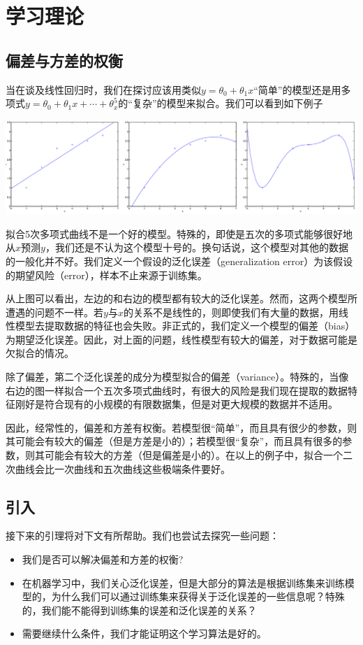 \section{学习理论}
\subsection{偏差与方差的权衡}
当在谈及线性回归时，我们在探讨应该用类似$y=\theta_0+\theta_1x$“简单”的模型还是用多项式$y=\theta_0+\theta_1x+\cdots+\theta_x^5$的“复杂”的模型来拟合。我们可以看到如下例子
\begin{center}
\includegraphics[scale=0.5]{../figures/LT1.PNG} 
\end{center}
拟合5次多项式曲线不是一个好的模型。特殊的，即使是五次的多项式能够很好地从$x$预测$y$，我们还是不认为这个模型十号的。换句话说，这个模型对其他的数据的一般化并不好。我们定义一个假设的泛化误差（generalization error）为该假设的期望风险（error），样本不止来源于训练集。

从上图可以看出，左边的和右边的模型都有较大的泛化误差。然而，这两个模型所遭遇的问题不一样。若$y$与$x$的关系不是线性的，则即使我们有大量的数据，用线性模型去提取数据的特征也会失败。非正式的，我们定义一个模型的偏差（bias）为期望泛化误差。因此，对上面的问题，线性模型有较大的偏差，对于数据可能是欠拟合的情况。

除了偏差，第二个泛化误差的成分为模型拟合的偏差（variance）。特殊的，当像右边的图一样拟合一个五次多项式曲线时，有很大的风险是我们现在提取的数据特征刚好是符合现有的小规模的有限数据集，但是对更大规模的数据并不适用。

因此，经常性的，偏差和方差有权衡。若模型很“简单”，而且具有很少的参数，则其可能会有较大的偏差（但是方差是小的）；若模型很“复杂”，而且具有很多的参数，则其可能会有较大的方差（但是偏差是小的）。在以上的例子中，拟合一个二次曲线会比一次曲线和五次曲线这些极端条件要好。

\subsection{引入}
接下来的引理将对下文有所帮助。我们也尝试去探究一些问题：
\begin{itemize}
\item 我们是否可以解决偏差和方差的权衡?
\item 在机器学习中，我们关心泛化误差，但是大部分的算法是根据训练集来训练模型的，为什么我们可以通过训练集来获得关于泛化误差的一些信息呢？特殊的，我们能不能得到训练集的误差和泛化误差的关系？
\item 需要继续什么条件，我们才能证明这个学习算法是好的。
\end{itemize}

